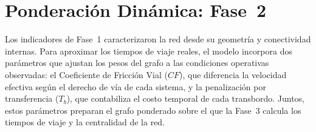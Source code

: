 \section{Ponderación Dinámica: Fase~2}
\label{sec:fase2-ponderacion}

Los indicadores de Fase~1 caracterizaron la red desde su geometría y
conectividad internas. Para aproximar los tiempos de viaje reales, el modelo
incorpora dos parámetros que ajustan los pesos del grafo a las condiciones
operativas observadas: el Coeficiente de Fricción Vial ($CF$), que diferencia la
velocidad efectiva según el derecho de vía de cada sistema, y la penalización
por transferencia ($T_b$), que contabiliza el costo temporal de cada transbordo.
Juntos, estos parámetros preparan el grafo ponderado sobre el que la Fase~3
calcula los tiempos de viaje y la centralidad de la red.



